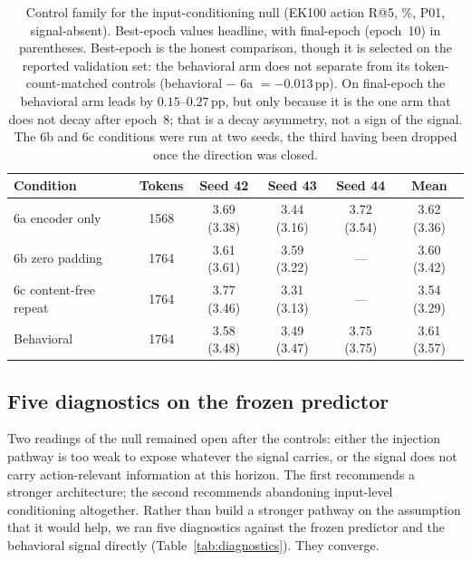 \begin{table}[t]
  \caption{Control family for the input-conditioning null (EK100 action R@5,
  \%, P01, signal-absent). Best-epoch values headline, with final-epoch
  (epoch~10) in parentheses. Best-epoch is the honest comparison, though it is
  selected on the reported validation set: the behavioral arm does not separate
  from its token-count-matched controls (behavioral $-$ 6a $= -0.013$\,pp). On
  final-epoch the behavioral arm leads by $0.15$--$0.27$\,pp, but only because it
  is the one arm that does not decay after epoch~8; that is a decay asymmetry, not
  a sign of the signal. The 6b and 6c conditions were run at two seeds, the third
  having been dropped once the direction was closed.}
  \label{tab:main}
  \centering
  \begin{tabular}{lccccc}
    \toprule
    Condition & Tokens & Seed 42 & Seed 43 & Seed 44 & Mean \\
    \midrule
    6a encoder only        & 1568 & 3.69 (3.38) & 3.44 (3.16) & 3.72 (3.54) & 3.62 (3.36) \\
    6b zero padding        & 1764 & 3.61 (3.61) & 3.59 (3.22) & ---         & 3.60 (3.42) \\
    6c content-free repeat & 1764 & 3.77 (3.46) & 3.31 (3.13) & ---         & 3.54 (3.29) \\
    Behavioral             & 1764 & 3.58 (3.48) & 3.49 (3.47) & 3.75 (3.75) & 3.61 (3.57) \\
    \bottomrule
  \end{tabular}
\end{table}

\subsection{Five diagnostics on the frozen predictor}
\label{subsec:diagnostics}

Two readings of the null remained open after the controls: either the injection
pathway is too weak to expose whatever the signal carries, or the signal does
not carry action-relevant information at this horizon. The first recommends a
stronger architecture; the second recommends abandoning input-level conditioning
altogether. Rather than build a stronger pathway on the assumption that it would
help, we ran five diagnostics against the frozen predictor and the behavioral
signal directly (Table~\ref{tab:diagnostics}). They converge.

